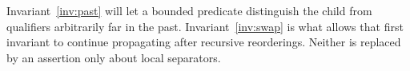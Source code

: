 Invariant~\ref{inv:past} will let a bounded predicate distinguish
the child from qualifiers arbitrarily far in the past.
Invariant~\ref{inv:swap} is what allows that first invariant to
continue propagating after recursive reorderings. Neither is
replaced by an assertion only about local separators.
